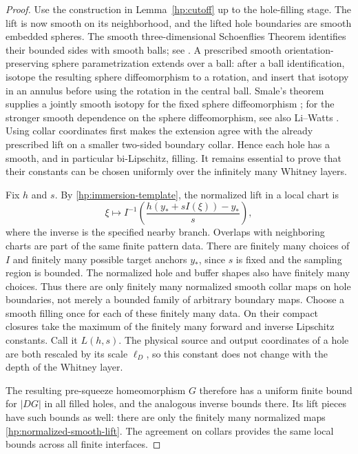 \begin{proof}
Use the construction in Lemma~\ref{hp:cutoff} up to the hole-filling
stage.  The lift is now smooth on its neighborhood, and the lifted
hole boundaries are smooth embedded spheres.  The smooth
three-dimensional Schoenflies Theorem identifies their bounded sides
with smooth balls; see \cite[Section~1.1, Theorem~1.1]{Hatcher2023}.
A prescribed smooth orientation-preserving
sphere parametrization extends over a ball: after a ball
identification, isotope the resulting sphere diffeomorphism to a
rotation, and insert that isotopy in an annulus before using the
rotation in the central ball.  Smale's theorem supplies a jointly
smooth isotopy for the fixed sphere diffeomorphism
\cite[Theorem~6]{Smale1959}; for the stronger smooth dependence on
the sphere diffeomorphism, see also Li--Watts
\cite[Theorem~1.5]{LiWatts2011}.
Using collar coordinates first makes
the extension agree with the already prescribed lift on a smaller
two-sided boundary collar.  Hence each hole has a smooth, and in
particular bi-Lipschitz, filling.  It remains essential to prove that
their constants can be chosen uniformly over the infinitely many
Whitney layers.

Fix $h$ and $s$.  By \eqref{hp:immersion-template}, the normalized
lift in a local chart is
\begin{equation}\label{hp:normalized-smooth-lift}
 \xi\longmapsto
 I^{-1}\!\left(
   \frac{h(y_*+sI(\xi))-y_*}{s}
 \right),
\end{equation}
where the inverse is the specified nearby branch.  Overlaps with
neighboring charts are part of the same finite pattern data.  There
are finitely many choices of $I$ and finitely many possible target
anchors $y_*$, since $s$ is fixed and the sampling region is bounded.
The normalized hole and buffer shapes also have finitely many
choices.  Thus there are only finitely many normalized smooth collar
maps on hole boundaries, not merely a bounded family of arbitrary
boundary maps.  Choose a smooth filling once for each of these
finitely many data.  On their compact closures take the maximum of
the finitely many forward and inverse Lipschitz constants.  Call it
$L(h,s)$.  The physical source and output coordinates of a hole are
both rescaled by its scale $\ell_D$, so this constant does not change
with the depth of the Whitney layer.

The resulting pre-squeeze homeomorphism $G$ therefore has a uniform
finite bound for $|DG|$ in all filled holes, and the analogous
inverse bounds there.  Its lift pieces have such bounds as well:
there are only the finitely many normalized maps
\eqref{hp:normalized-smooth-lift}.  The agreement on collars provides
the same local bounds across all finite interfaces.


\end{proof}
